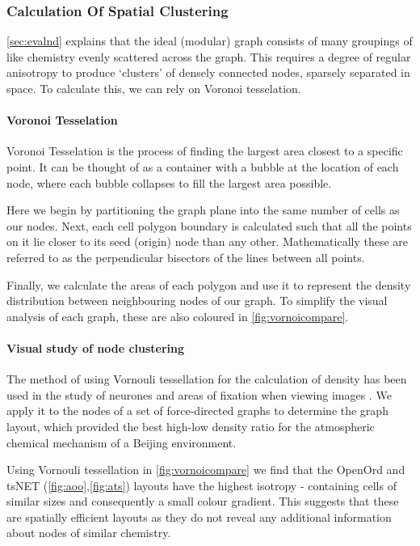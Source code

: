 \subsubsection{Calculation Of Spatial Clustering}\label{sec:nodedensitya}
\autoref{sec:evalnd} explains that the ideal (modular) graph consists of many groupings of like chemistry evenly scattered across the graph.  This requires a degree of regular anisotropy to produce `clusters' of densely connected nodes, sparsely separated in space. To calculate this, we can rely on Voronoi tesselation.



\paragraph*{Voronoi Tesselation}
Voronoi Tesselation is the process of finding the largest area closest to a specific point. It can be thought of as a container with a bubble at the location of each node, where each bubble collapses to fill the largest area possible.

Here we begin by partitioning the graph plane into the same number of cells as our nodes. Next, each cell polygon boundary is calculated such that all the points on it lie closer to its seed (origin) node than any other. Mathematically these are referred to as the perpendicular bisectors of the lines between all points.

Finally, we calculate the areas of each polygon and use it to represent the density distribution between neighbouring nodes of our graph. To simplify the visual analysis of each graph, these are also coloured in \autoref{fig:vornoicompare}.


\paragraph*{Visual study of node clustering}

The method of using Vornouli tessellation for the calculation of density has been used in the study of neurones \citep{neurone} and areas of fixation when viewing images \citep{fixation}. We apply it to the nodes of a set of force-directed graphs to determine the graph layout, which provided the best high-low density ratio for the atmospheric chemical mechanism of a Beijing environment.

Using Vornouli tessellation in \autoref{fig:vornoicompare} we find that
the OpenOrd and tsNET (\autoref{fig:aoo},\autoref{fig:ats}) layouts have the highest isotropy - containing cells of similar sizes and consequently a small colour gradient. This suggests that these are spatially efficient layouts as they do not reveal any additional information about nodes of similar chemistry.

